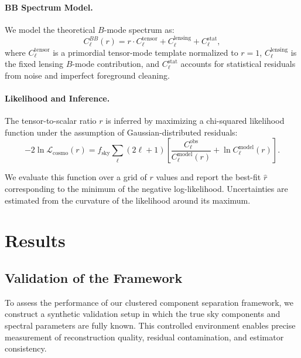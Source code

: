 \documentclass[%
 reprint,
bibnotes,
 amsmath,amssymb,
 aps,
floatfix, 
]{revtex4-2}
\begin{document}
\paragraph{BB Spectrum Model.}
We model the theoretical \( B \)-mode spectrum as:
\[
C_\ell^{BB}(r) = r \cdot C_\ell^{\mathrm{tensor}} + C_\ell^{\mathrm{lensing}} + C_\ell^{\mathrm{stat}},
\]
where \( C_\ell^{\mathrm{tensor}} \) is a primordial tensor-mode template normalized to \( r = 1 \), \( C_\ell^{\mathrm{lensing}} \) is the fixed lensing \( B \)-mode contribution, and \( C_\ell^{\mathrm{stat}} \) accounts for statistical residuals from noise and imperfect foreground cleaning.

\paragraph{Likelihood and Inference.}
The tensor-to-scalar ratio \( r \) is inferred by maximizing a chi-squared likelihood function under the assumption of Gaussian-distributed residuals:
\[
-2 \ln \mathcal{L}_{\mathrm{cosmo}}(r) = f_{\mathrm{sky}} \sum_\ell (2\ell + 1) \left[ \frac{C_\ell^{\mathrm{obs}}}{C_\ell^{\mathrm{model}}(r)} + \ln C_\ell^{\mathrm{model}}(r) \right].
\]


We evaluate this function over a grid of \( r \) values and report the best-fit \( \hat{r} \) corresponding to the minimum of the negative log-likelihood. Uncertainties are estimated from the curvature of the likelihood around its maximum.

\section{Results}
\label{sec:results}

\subsection{Validation of the Framework}
\label{subsec:validation}

To assess the performance of our clustered component separation framework, we construct a synthetic validation setup in which the true sky components and spectral parameters are fully known. This controlled environment enables precise measurement of reconstruction quality, residual contamination, and estimator consistency.
\end{document}
